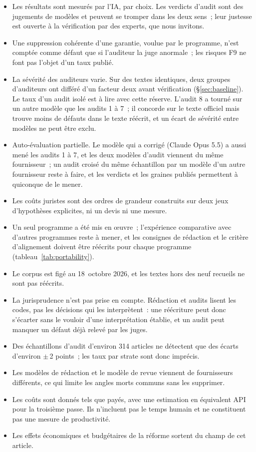 \documentclass[11pt,a4paper]{article}
\begin{document}
\begin{itemize}
  \item Les résultats sont mesurés par l'IA, par choix. Les verdicts d'audit sont des jugements de modèles et peuvent se tromper dans les deux sens~; leur justesse est ouverte à la vérification par des experts, que nous invitons.
  \item Une suppression cohérente d'une garantie, voulue par le programme, n'est comptée comme défaut que si l'auditeur la juge anormale~; les risques F9 ne font pas l'objet d'un taux publié.
  \item La sévérité des auditeurs varie. Sur des textes identiques, deux groupes d'auditeurs ont différé d'un facteur deux avant vérification (\S\ref{sec:baseline}). Le taux d'un audit isolé est à lire avec cette réserve. L'audit 8 a tourné sur un autre modèle que les audits 1 à 7~; il concorde sur le texte officiel mais trouve moins de défauts dans le texte réécrit, et un écart de sévérité entre modèles ne peut être exclu.
  \item Auto-évaluation partielle. Le modèle qui a corrigé (Claude Opus 5.5) a aussi mené les audits 1 à 7, et les deux modèles d'audit viennent du même fournisseur~; un audit croisé du même échantillon par un modèle d'un autre fournisseur reste à faire, et les verdicts et les graines publiés permettent à quiconque de le mener.
  \item Les coûts \og juristes \fg{} sont des ordres de grandeur construits sur deux jeux d'hypothèses explicites, ni un devis ni une mesure.
  \item Un seul programme a été mis en \oe{}uvre~; l'expérience comparative avec d'autres programmes reste à mener, et les consignes de rédaction et le critère d'alignement doivent être réécrits pour chaque programme (tableau~\ref{tab:portability}).
  \item Le corpus est figé au 18~octobre 2026, et les textes hors des neuf recueils ne sont pas réécrits.
  \item La jurisprudence n'est pas prise en compte. Rédaction et audits lisent les codes, pas les décisions qui les interprètent~: une réécriture peut donc s'écarter sans le vouloir d'une interprétation établie, et un audit peut manquer un défaut déjà relevé par les juges.
  \item Des échantillons d'audit d'environ 314 articles ne détectent que des écarts d'environ $\pm$\,2 points~; les taux par strate sont donc imprécis.
  \item Les modèles de rédaction et le modèle de revue viennent de fournisseurs différents, ce qui limite les angles morts communs sans les supprimer.
  \item Les coûts sont donnés tels que payés, avec une estimation en équivalent API pour la troisième passe. Ils n'incluent pas le temps humain et ne constituent pas une mesure de productivité.
  \item Les effets économiques et budgétaires de la réforme sortent du champ de cet article.
\end{itemize}
\end{document}
